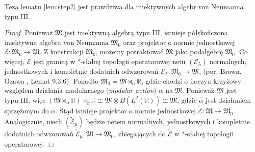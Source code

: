 \begin{Lemma}
Teza lematu \ref{lem:step2} jest prawdziwa dla iniektywnych algebr von Neumanna
typu III.
\end{Lemma}
\begin{proof}
Ponieważ $\mathfrak{M}$ jest iniektywną algebrą typu III,
istnieje półskończona iniektywna algebra von Neumanna
$\mathfrak{M}_{0}$ oraz projektor o normie jednostkowej
$\mathcal{E}: \mathfrak{M}_{0} \rightarrow \mathfrak{M}$.
Z konstrukcji $\mathfrak{M}_{0}$, możemy potraktować
$\mathfrak{M}$ jako podalgebrę $\mathfrak{M}_{0}$.
Co więcej, $\mathcal{E}$ jest granicą w *-słabej topologii operatorowej
netu $(\mathcal{E}_{\lambda})$ normalnych, jednostkowych i kompletnie dodatnich
odwzorowań $\mathcal{E}_{\lambda} : \mathfrak{M}_{0} \rightarrow \mathfrak{M}$,
(por. Brown, Ozawa \cite{Brown2008}, Lemat 9.3.6).
Ponadto
$\mathfrak{M}_{0} = \mathfrak{M} \rtimes_{\alpha} \mathbb{R}$,
gdzie chodzi o iloczyn krzyżowy względem działania modularnego
(\emph{modular action}) $\alpha$ na $\mathfrak{M}$.
Ponieważ $\mathfrak{M}$ jest typu III, więc
$(\mathfrak{M} \rtimes_{\alpha} \mathbb{R}) \rtimes_{\hat{\alpha}} \mathbb{R}
\cong \mathfrak{M} \bar{\otimes} B(L^{2}(\mathbb{R})) \cong \mathfrak{M}$,
gdzie $\hat{\alpha}$ jest działaniem sprzężonym do $\alpha$.
Stąd istnieje projektor o normie jednostkowej
$\tilde{\mathcal{E}} : \mathfrak{M} \rightarrow \mathfrak{M}_{0}$.
Analogicznie, niech $(\tilde{\mathcal{E}}_{\mu})$
będzie netem normalnych, jednostkowych i kompletnie dodatnich odwzorowań
$\tilde{\mathcal{E}}_{\mu}: \mathfrak{M} \rightarrow \mathfrak{M}_{0}$,
zbiegających do $\tilde{\mathcal{E}}$ w *-słabej topologii operatorowej.


\end{proof}
